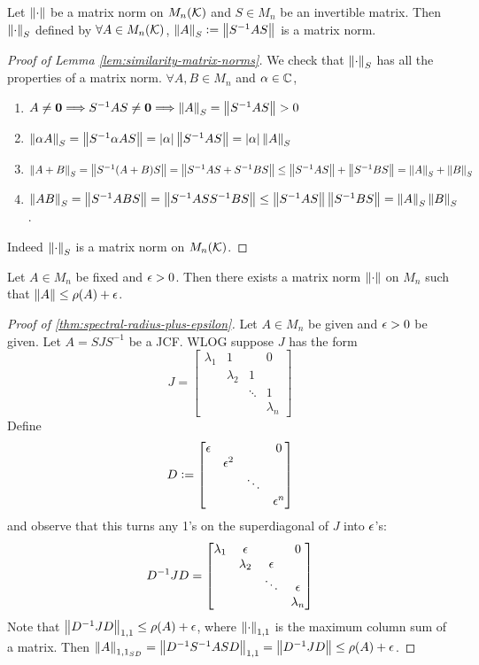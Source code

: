 \begin{lemma}
\label{lem:similarity-matrix-norms}
Let $\left\lVert\cdot\right\rVert$ be a matrix norm on $M_n(\mathcal{K})$ and $S \in M_n$ be an invertible matrix. Then $\left\lVert\cdot\right\rVert_S$ defined by $\forall A \in M_n(\mathcal{K})$, $\left\lVert A\right\rVert_S \vcentcolon= \left\lVert S^{-1}AS\right\rVert$ is a matrix norm.
\end{lemma}
\begin{proof}[Proof of Lemma \ref{lem:similarity-matrix-norms}]
We check that $\left\lVert\cdot\right\rVert_S$ has all the properties of a matrix norm. $\forall A,B \in M_n$ and $\alpha \in \mathbb C$,
\begin{enumerate}
    \item $A \not= \mathbf{0} \Longrightarrow S^{-1}AS \not= \mathbf{0} \Longrightarrow \left\lVert A\right\rVert_S = \left\lVert S^{-1}AS\right\rVert > 0$
    \item $\left\lVert\alpha A\right\rVert_S = \left\lVert S^{-1}\alpha AS\right\rVert = |\alpha| \left\lVert S^{-1}AS\right\rVert = |\alpha|\left\lVert A\right\rVert_S$
    \item $\left\lVert A+B\right\rVert_S = \left\lVert S^{-1}(A+B)S\right\rVert = \left\lVert S^{-1}AS + S^{-1}BS\right\rVert \le \left\lVert S^{-1}AS\right\rVert + \left\lVert S^{-1}BS\right\rVert = \left\lVert A\right\rVert_S + \left\lVert B\right\rVert_S$
    \item $\left\lVert AB\right\rVert_S = \left\lVert S^{-1}ABS\right\rVert = \left\lVert S^{-1}ASS^{-1}BS\right\rVert \le \left\lVert S^{-1}AS\right\rVert\left\lVert S^{-1}BS\right\rVert = \left\lVert A\right\rVert_S\left\lVert B\right\rVert_S$.
\end{enumerate}
Indeed $\left\lVert\cdot\right\rVert_S$ is a matrix norm on $M_n(\mathcal{K})$.
\end{proof}

\begin{theorem}
\label{thm:spectral-radius-plus-epsilon}
Let $A \in M_n$ be fixed and $\epsilon > 0$. Then there exists a matrix norm $\left\lVert\cdot\right\rVert$ on $M_n$ such that $\left\lVert A\right\rVert \le \rho(A) + \epsilon$.
\end{theorem}
\begin{proof}[Proof of \ref{thm:spectral-radius-plus-epsilon}]
Let $A \in M_n$ be given and $\epsilon > 0$ be given. Let $A = SJS^{-1}$ be a JCF. WLOG suppose $J$ has the form
\[
    J = \begin{bmatrix}
    \lambda_1 & 1 & & 0 \\
    & \lambda_2 & 1 & \\
    & & \ddots & 1\\
    & & & \lambda_n
    \end{bmatrix}
\]
Define
\[
    D \vcentcolon= \begin{bmatrix}
    \epsilon & & & 0 \\
    & \epsilon^2 & & \\
    & & \ddots & \\
    & & & \epsilon^n
    \end{bmatrix}
\]
and observe that this turns any 1's on the superdiagonal of $J$ into $\epsilon$'s:
\[
    D^{-1}JD = \begin{bmatrix}
    \lambda_1 & \epsilon & & 0 \\
    & \lambda_2 & \epsilon & \\
    & & \ddots & \epsilon\\
    & & & \lambda_n
    \end{bmatrix}
\]
Note that $\left\lVert D^{-1}JD\right\rVert_{1,1} \le \rho(A) + \epsilon$, where $\left\lVert\cdot\right\rVert_{1,1}$ is the maximum column sum of a matrix. Then $\left\lVert A\right\rVert_{1,1_{SD}} = \left\lVert D^{-1}S^{-1}ASD\right\rVert_{1,1} = \left\lVert D^{-1}JD\right\rVert \le \rho(A) + \epsilon$.
\end{proof}

